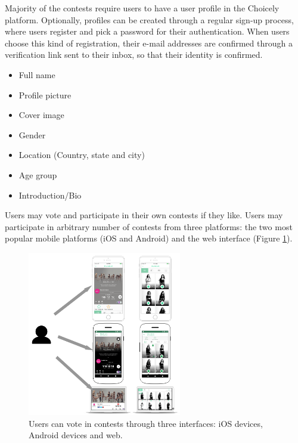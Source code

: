     Majority of the contests require users to have a user profile in the Choicely platform. Optionally, profiles can be created through a regular sign-up process, where users register and pick a password for their authentication. When users choose this kind of registration, their e-mail addresses are confirmed through a verification link sent to their inbox, so that their identity is confirmed.      

    \begin{itemize}
        \item Full name
        \item Profile picture
        \item Cover image
        \item Gender
        \item Location (Country, state and city)
        \item Age group
        \item Introduction/Bio
    \end{itemize}

    Users may vote and participate in their own contests if they like. Users may participate in arbitrary number of contests from three platforms: the two most popular mobile platforms (iOS and Android) and the web interface (Figure \ref{choicely_platforms}). 
    
    \begin{figure}[h] 
        \begin{center}
            \includegraphics[width=0.6\textwidth]{images/choicely_platforms.png}
            \caption{Users can vote in contests through three interfaces: iOS devices, Android devices and web.}
            \label{choicely_platforms}
        \end{center}
    \end{figure}

